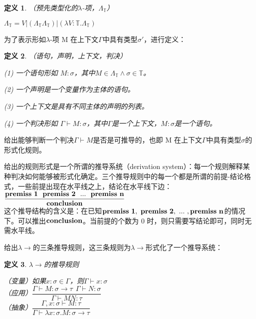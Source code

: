 \documentclass[UTF8]{article}
\newtheorem{thm}{定义}[section]
\begin{document}
		\begin{thm}（预先类型化的$\lambda$-项，$\Lambda_\mathbb{T}$）
			
			$\Lambda_\mathbb{T} = V|(\Lambda_\mathbb{T}\Lambda_\mathbb{T})|(\lambda V:\mathbb{T}.\Lambda_\mathbb{T})$
		\end{thm}
		
		为了表示形如$\lambda$-项 M 在上下文$\Gamma$中具有类型$\sigma'$，进行定义：
		
		\begin{thm}（语句，声明，上下文，判决）
			
			(1) 一个语句形如 $M:\sigma$，其中$M\in\Lambda_\mathbb{T} \land\sigma\in\mathbb{T}$。
			
			(2) 一个声明是一个变量作为主体的语句。
			
			(3) 一个上下文是具有不同主体的声明的列表。
			
			(4) 一个判决形如 $\Gamma\vdash M:\sigma$，其中$\Gamma$是一个上下文，$M:\sigma$是一个语句。
		\end{thm}
	
		给出能够判断一个判决$\Gamma\vdash M$是否是可推导的，也即 M 在上下文$\Gamma$中具有类型$\sigma$的形式化规则。
		
		给出的规则形式是一个所谓的推导系统（derivation system）：每一个规则解释某种判决如何能够被形式化确定。三个推导规则中的每一个都是所谓的前提-结论格式，一些前提出现在水平线之上，结论在水平线下边：\\
		
			$\bf\dfrac{premiss\ 1\ \ premiss\ 2\ \ ...\ \ premiss\ n}{conclusion}$\\
		
		这个推导结构的含义是：在已知$\bf premiss\ 1,\ premiss\ 2,\ ...\ ,premiss\ n$的情况下。可以推出$\bf conclusion$。当前提的个数为 0 时，则只需要写结论即可，同时无需水平线。
		
		给出$\lambda{\rightarrow}$的三条推导规则，这三条规则为$\lambda{\rightarrow}$形式化了一个推导系统：
		
		\begin{thm} $\lambda{\rightarrow}$的推导规则
			
			（变量）如果$x:\sigma\in\Gamma$，则$\Gamma\vdash x:\sigma$\\
			
			（应用）$\dfrac{\Gamma\vdash M:\sigma\rightarrow\tau\ \ \Gamma\vdash N:\sigma}{\Gamma\vdash MN:\tau}$\\
			
			（抽象）$\dfrac{\Gamma,x:\sigma\vdash M:\tau}{\Gamma\vdash\lambda x:\sigma.M:\sigma\rightarrow\tau}$\\
			
		\end{thm}
	
		
\end{document}
